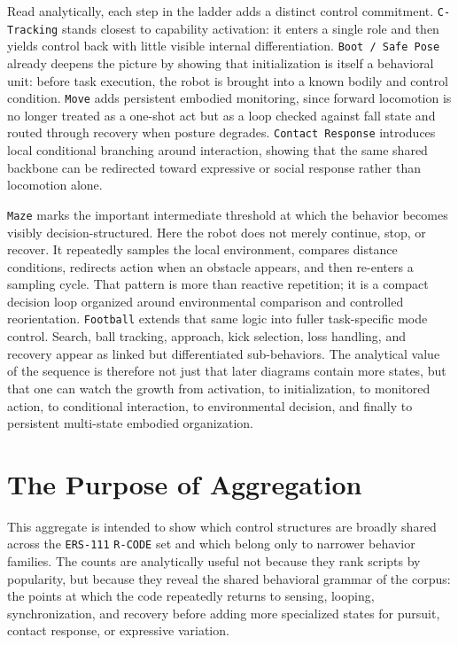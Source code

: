 \documentclass[11pt]{article}
\begin{document}
Read analytically, each step in the ladder adds a distinct control
commitment. \texttt{C-Tracking} stands closest to capability
activation: it enters a single role and then yields control back with
little visible internal differentiation. \texttt{Boot / Safe Pose}
already deepens the picture by showing that initialization is itself a
behavioral unit: before task execution, the robot is brought into a
known bodily and control condition. \texttt{Move} adds persistent
embodied monitoring, since forward locomotion is no longer treated as a
one-shot act but as a loop checked against fall state and routed
through recovery when posture degrades. \texttt{Contact Response}
introduces local conditional branching around interaction, showing that
the same shared backbone can be redirected toward expressive or social
response rather than locomotion alone.

\texttt{Maze} marks the important intermediate threshold at which the
behavior becomes visibly decision-structured. Here the robot does not
merely continue, stop, or recover. It repeatedly samples the local
environment, compares distance conditions, redirects action when an
obstacle appears, and then re-enters a sampling cycle. That pattern is
more than reactive repetition; it is a compact decision loop organized
around environmental comparison and controlled reorientation.
\texttt{Football} extends that same logic into fuller task-specific
mode control. Search, ball tracking, approach, kick selection, loss
handling, and recovery appear as linked but differentiated
sub-behaviors. The analytical value of the sequence is therefore not
just that later diagrams contain more states, but that one can watch
the growth from activation, to initialization, to monitored action, to
conditional interaction, to environmental decision, and finally to
persistent multi-state embodied organization.

\section*{The Purpose of Aggregation}

This aggregate is intended to show which control structures are broadly
shared across the \texttt{ERS-111} \texttt{R-CODE} set and which belong
only to narrower behavior families. The counts are analytically useful
not because they rank scripts by popularity, but because they reveal
the shared behavioral grammar of the corpus: the points at which the
code repeatedly returns to sensing, looping, synchronization, and
recovery before adding more specialized states for pursuit, contact
response, or expressive variation.
\end{document}
